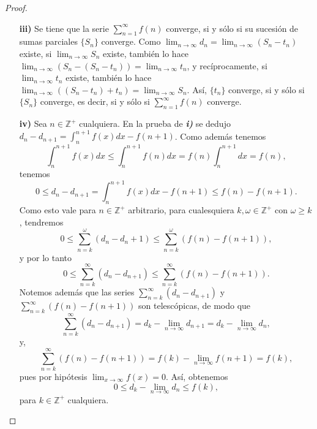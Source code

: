 \begin{proof}
\begin{itemize}
    \item[\textbf{iii)}] Se tiene que la serie $\sum_{n=1}^\infty f(n)$ converge, si y sólo si su sucesión de sumas parciales $\lbrace{S_n\rbrace}$ converge. Como $\lim_{n\to\infty} d_n=\lim_{n\to\infty}(S_n-t_n)$ existe, si $\lim_{n\to\infty}S_n$ existe, también lo hace $\lim_{n\to\infty}(S_n-(S_n-t_n))=\lim_{n\to\infty}t_n$, y recíprocamente, si $\lim_{n\to\infty}t_n$ existe, también lo hace $\lim_{n\to\infty}((S_n-t_n)+t_n)=\lim_{n\to\infty}S_n$. Así, $\lbrace{t_n\rbrace}$ converge, si y sólo si $\lbrace{S_n\rbrace}$ converge, es decir, si y sólo si $\sum_{n=1}^\infty f(n)$ converge.
    \item[\textbf{iv)}] Sea $n\in\mathbb{Z}^+$ cualquiera. En la prueba de \textit{\textbf{i)}} se dedujo $d_n-d_{n+1}=\int_n^{n+1}f(x)dx-f(n+1)$. Como además tenemos
    \begin{equation*}
      \int_n^{n+1}f(x)dx\leq\int_n^{n+1}f(n)dx=f(n)\int_n^{n+1}dx=f(n),
    \end{equation*}
    tenemos
    \begin{equation*}
      0\leq d_n-d_{n+1}=\int_n^{n+1}f(x)dx-f(n+1)\leq f(n)-f(n+1).
    \end{equation*}
    Como esto vale para $n\in\mathbb{Z}^+$ arbitrario, para cualesquiera $k,\omega\in\mathbb{Z}^+$ con $\omega\geq k$, tendremos
    \begin{equation*}
      0\leq\sum_{n=k}^{\omega}(d_n-d_n+1)\leq\sum_{n=k}^\omega(f(n)-f(n+1)),
    \end{equation*}
    y por lo tanto
    \begin{equation*}
      0\leq\sum_{n=k}^\infty(d_n-d_{n+1})\leq\sum_{n=k}^\infty(f(n)-f(n+1)).
    \end{equation*}
    Notemos además que las series $\sum_{n=k}^\infty(d_n-d_{n+1})$ y $\sum_{n=k}^\infty(f(n)-f(n+1))$ son telescópicas, de modo que
    \begin{equation*}
      \sum_{n=k}^\infty(d_n-d_{n+1})=d_k-\lim_{n\to\infty}d_{n+1}=d_k-\lim_{n\to\infty}d_{n},
    \end{equation*}
    y,
    \begin{equation*}
      \sum_{n=k}^\infty(f(n)-f(n+1))=f(k)-\lim_{n\to\infty}f(n+1)=f(k),
    \end{equation*}
    pues por hipótesis $\lim_{x\to\infty}f(x)=0$. Así, obtenemos
    \begin{equation*}
      0\leq d_k-\lim_{n\to\infty}d_n\leq f(k),
    \end{equation*}
    para $k\in\mathbb{Z}^+$ cualquiera.
  \end{itemize}
\end{proof}
